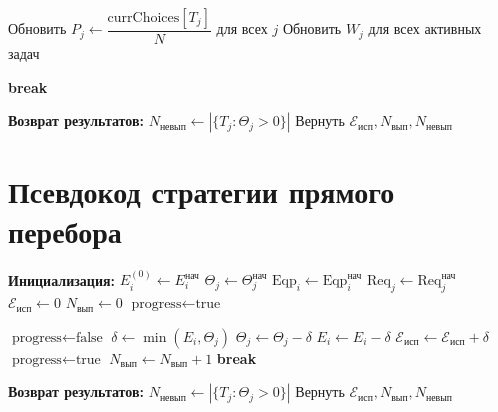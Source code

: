 \begin{breakablealgorithm}
\begin{algorithmic}[1]
		\State \quad Обновить $P_j \gets \dfrac{\text{currChoices}[T_j]}{N}$ для всех $j$ 
		\State \quad Обновить $W_j$ для всех активных задач 

		\State \quad \textbf{break}
		\EndIf
		\EndWhile

		\State \textbf{Возврат результатов:}
		\State \quad $N_{\text{невып}} \gets |\{T_j : \Theta_j > 0\}|$
		\State \quad Вернуть $\mathcal{E}_{\text{исп}}, N_{\text{вып}}, N_{\text{невып}}$
	\end{algorithmic}
\end{breakablealgorithm}

\clearpage

\section{Псевдокод стратегии прямого перебора}\label{app:pseudo_3}

\begin{breakablealgorithm}
	\label{pscode:p}
	\caption{Псевдокод стратегии $\Gamma_{\text{прям}}$}
	\begin{algorithmic}[1]
		\State \textbf{Инициализация:}
		\State \quad $E_i^{(0)} \gets E_i^{\text{нач}}$ 
		\State \quad $\Theta_j \gets \Theta_j^{\text{нач}}$ 
		\State \quad $\text{Eqp}_i \gets \text{Eqp}_i^{\text{нач}}$ 
		\State \quad $\text{Req}_j \gets \text{Req}_j^{\text{нач}}$ 
		\State \quad $\mathcal{E}_{\text{исп}} \gets 0$ 
		\State \quad $N_{\text{вып}} \gets 0$ 
		\State \quad $\text{progress} \gets \text{true}$

		\State \quad $\text{progress} \gets \text{false}$
		\State \quad $\delta \gets \min(E_i, \Theta_j)$ 
		\State \quad $\Theta_j \gets \Theta_j - \delta$
		\State \quad $E_i \gets E_i - \delta$
		\State \quad $\mathcal{E}_{\text{исп}} \gets \mathcal{E}_{\text{исп}} + \delta$
		\State \quad $\text{progress} \gets \text{true}$
		\State \quad $N_{\text{вып}} \gets N_{\text{вып}} + 1$
		\EndIf
		\State \quad \textbf{break} 
		\EndIf
		\EndFor
		\EndIf
		\EndFor
		\EndWhile

		\State \textbf{Возврат результатов:}
		\State \quad $N_{\text{невып}} \gets |\{T_j : \Theta_j > 0\}|$
		\State \quad Вернуть $\mathcal{E}_{\text{исп}}, N_{\text{вып}}, N_{\text{невып}}$
	\end{algorithmic}
\end{breakablealgorithm}